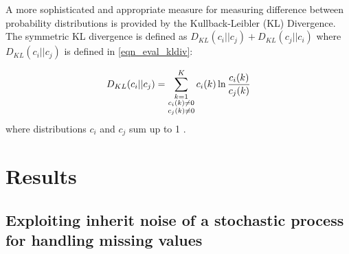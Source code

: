 \documentclass{report}
\begin{document}
A more sophisticated and appropriate measure for measuring difference between probability distributions is provided by the Kullback-Leibler (KL) Divergence. The symmetric KL divergence is defined as $D_{KL}(c_i||c_j)+D_{KL}(c_j||c_i)$ where $D_{KL}(c_i||c_j)$ is defined in \ref{eqn_eval_kldiv}:

\begin{equation}
		D_{KL}(c_i||c_j) = \sum_{\substack{
																	   k=1 \\
																	   c_i(k) \neq 0 \\
																	   c_j(k) \neq 0
																	  }}^{K} c_i(k) \ln{\frac{c_i(k)}{c_j(k)}}  \\
	\label{eqn_eval_kldiv}
\end{equation}
where distributions $c_i$ and $c_j$ sum up to 1 \cite{Kullback1951}.

\chapter{Results}

\section{Exploiting inherit noise of a stochastic process for handling missing values}
\end{document}
